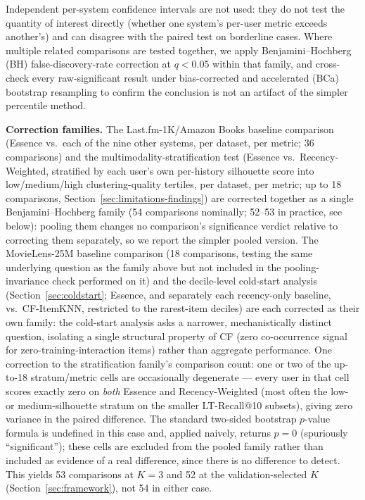 \documentclass[11pt,a4paper]{article}
\begin{document}
Independent per-system confidence
intervals are not used: they do not test the quantity of interest
directly (whether one system's per-user metric exceeds another's) and can
disagree with the paired test on borderline cases. Where multiple related comparisons are tested together,
we apply Benjamini--Hochberg (BH) false-discovery-rate correction at
$q<0.05$ within that family, and cross-check every raw-significant result
under bias-corrected and accelerated (BCa) bootstrap resampling to confirm
the conclusion is not an artifact of the simpler percentile method.

\textbf{Correction families.} The Last.fm-1K/Amazon Books baseline
comparison (Essence vs.\ each of the nine other systems, per dataset, per
metric; 36 comparisons) and the multimodality-stratification test
(Essence vs.\ Recency-Weighted, stratified by each user's own per-history
silhouette score into low/medium/high clustering-quality tertiles, per
dataset, per metric; up to 18 comparisons, Section~\ref{sec:limitations-findings})
are corrected together as a single Benjamini--Hochberg family (54
comparisons nominally; 52--53 in practice, see below): pooling them
changes no comparison's significance verdict relative to correcting them
separately, so we report the simpler pooled version. The MovieLens-25M
baseline comparison (18 comparisons, testing the same underlying
question as the family above but not included in the pooling-invariance
check performed on it) and the decile-level cold-start analysis (Section~\ref{sec:coldstart};
Essence, and separately each recency-only baseline, vs.\ CF-ItemKNN,
restricted to the rarest-item deciles) are each corrected as their own
family: the cold-start analysis asks a narrower, mechanistically distinct
question, isolating a single structural property of CF (zero
co-occurrence signal for zero-training-interaction items) rather than
aggregate performance. One correction to the stratification family's
comparison count: one or two of the up-to-18 stratum/metric cells are
occasionally degenerate --- every user in that cell scores exactly zero on
\emph{both} Essence and Recency-Weighted (most often the low- or
medium-silhouette stratum on the smaller LT-Recall@10 subsets), giving
zero variance in the paired difference. The standard two-sided bootstrap
$p$-value formula is undefined in this case and, applied naively, returns
$p=0$ (spuriously ``significant''); these cells are excluded from the
pooled family rather than included as evidence of a real difference,
since there is no difference to detect. This yields 53 comparisons at
$K=3$ and 52 at the validation-selected $K$ (Section~\ref{sec:framework}),
not 54 in either case.
\end{document}
